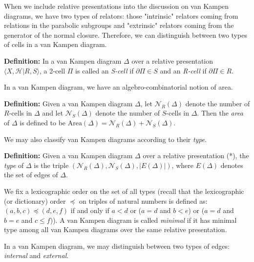 \documentclass[12pt]{article}
\newcommand{\vs}{\vskip10pt}
\begin{document}
	When we include relative presentations into the discussion on van Kampen diagrams, we have two types of relators: those "intrinsic" relators coming from relations in the parabolic subgroups and "extrinsic" relators coming from the generator of the normal closure. Therefore, we can distinguish between two types of cells in a van Kampen diagram. 
	
	\vs 
	
	\textbf{Definition: } In a van Kampen diagram $\Delta$ over a relative presentation $\langle X, \mathcal{H} \vert R, S \rangle$, a 2-cell $\Pi$ is called an \textit{S-cell} if $\partial \Pi \in S$ and an \textit{R-cell} if $\partial \Pi \in R$.

	\vs
	
	In a van Kampen diagram, we have an algebro-combinatorial notion of area.
	
	\vs 
	
	\textbf{Definition: } Given a van Kampen diagram $\Delta$, let $\mathcal{N}_R(\Delta)$ denote the number of $R$-cells in $\Delta$ and let $\mathcal{N}_S(\Delta)$ denote the number of $S$-cells in $\Delta$. Then the \textit{area} of $\Delta$ is defined to be $\text{Area}(\Delta) = \mathcal{N}_R(\Delta) + \mathcal{N}_S(\Delta)$.
	
	\vs 
	
	We may also classify van Kampen diagrams according to their \textit{type}. 
	
	\vs 
	
	\textbf{Definition: } Given a van Kampen diagram $\Delta$ over a relative presentation (*), the \textit{type} of $\Delta$ is the triple $(\mathcal{N}_{R}(\Delta), \mathcal{N}_S(\Delta), \vert E(\Delta) \vert)$, where $E(\Delta)$ denotes the set of edges of $\Delta$. 
	
	\vs 
	
	We fix a lexicographic order on the set of all types (recall that the lexicographic (or dictionary) order $\preccurlyeq$ on triples of natural numbers is defined as: $(a,b,c) \preccurlyeq (d,e,f)$ if and only if $a < d$ or ($a = d$ and $b < e$) or ($a = d$ and $b = e$ and $c \leq f$)). A van Kampen diagram is called \textit{minimal} if it has minimal type among all van Kampen diagrams over the same relative presentation. 
	
	\vs 
	
	In a van Kampen diagram, we may distinguish between two types of edges: \textit{internal} and \textit{external}. 
	
	\vs 
	
\end{document}

